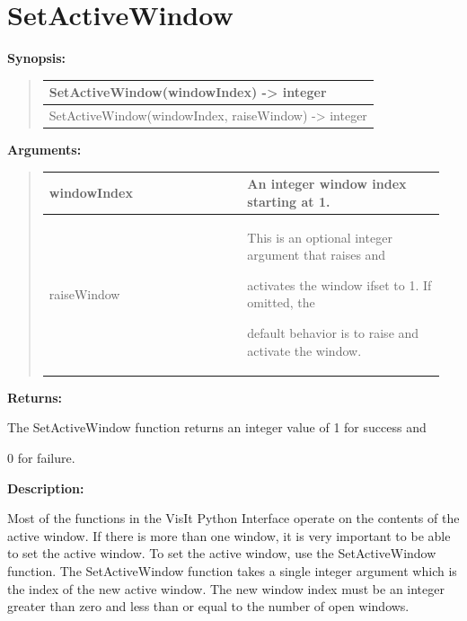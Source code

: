 \documentclass[letterpaper,10pt,english]{sphinxmanual}
\begin{document}
\section{SetActiveWindow}
\label{functions:setactivewindow}
\begin{DUlineblock}{0em}
\item[] \textbf{Synopsis:}
\end{DUlineblock}
\begin{quote}

\begin{tabulary}{\linewidth}{|L|}
\hline

SetActiveWindow(windowIndex) -\textgreater{} integer
\\
\hline
SetActiveWindow(windowIndex, raiseWindow) -\textgreater{} integer
\\
\hline\end{tabulary}

\end{quote}

\begin{DUlineblock}{0em}
\item[] 
\item[] \textbf{Arguments:}
\end{DUlineblock}
\begin{quote}

\begin{tabular}{|p{0.475\linewidth}|p{0.475\linewidth}|}
\hline

windowIndex
 & 
An integer window index starting at 1.
\\
\hline
raiseWindow
 & 
\begin{DUlineblock}{0em}
\item[] This is an optional integer argument that raises and
\item[] activates the window ifset to 1. If omitted, the
\item[] default behavior is to raise and activate the window.
\end{DUlineblock}
\\
\hline\end{tabular}

\end{quote}

\begin{DUlineblock}{0em}
\item[] 
\item[] \textbf{Returns:}
\item[] The SetActiveWindow function returns an integer value of 1 for success and
\item[] 0 for failure.
\item[] 
\item[] \textbf{Description:}
\item[] Most of the functions in the VisIt Python Interface operate on the
contents of the active window. If there is more than one window, it is very
important to be able to set the active window. To set the active window,
use the SetActiveWindow function. The SetActiveWindow function takes a
single integer argument which is the index of the new active window. The
new window index must be an integer greater than zero and less than or
equal to the number of open windows.
\end{DUlineblock}
\end{document}
